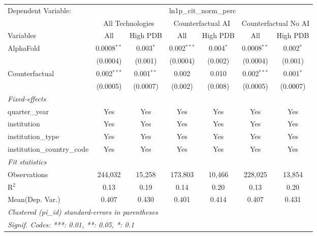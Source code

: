 \begingroup
\centering
\begin{tabular}{lcccccc}
   \tabularnewline \midrule \midrule
   Dependent Variable: & \multicolumn{6}{c}{ln1p\_cit\_norm\_perc}\\
 & \multicolumn{2}{c}{All Technologies} & \multicolumn{2}{c}{Counterfactual AI} & \multicolumn{2}{c}{Counterfactual No AI} \\
\cmidrule(lr){1-1}\cmidrule(lr){2-3} \cmidrule(lr){4-5} \cmidrule(lr){6-7}
Variables & \multicolumn{1}{c}{All} & \multicolumn{1}{c}{High PDB} & \multicolumn{1}{c}{All} & \multicolumn{1}{c}{High PDB} & \multicolumn{1}{c}{All} & \multicolumn{1}{c}{High PDB} \\
\cmidrule(lr){1-1}\cmidrule(lr){2-2} \cmidrule(lr){3-3} \cmidrule(lr){4-4} \cmidrule(lr){5-5} \cmidrule(lr){6-6} \cmidrule(lr){7-7}
   AlphaFold                    & 0.0008$^{**}$ & 0.003$^{*}$  & 0.002$^{***}$ & 0.004$^{*}$ & 0.0008$^{**}$ & 0.002$^{*}$\\   
                                & (0.0004)      & (0.001)      & (0.0004)      & (0.002)     & (0.0004)      & (0.001)\\   
   Counterfactual               & 0.002$^{***}$ & 0.001$^{**}$ & 0.002         & 0.010       & 0.002$^{***}$ & 0.001$^{*}$\\   
                                & (0.0005)      & (0.0007)     & (0.002)       & (0.008)     & (0.0005)      & (0.0007)\\   
   \midrule
   \emph{Fixed-effects}\\
   quarter\_year                & Yes           & Yes          & Yes           & Yes         & Yes           & Yes\\  
   institution                  & Yes           & Yes          & Yes           & Yes         & Yes           & Yes\\  
   institution\_type            & Yes           & Yes          & Yes           & Yes         & Yes           & Yes\\  
   institution\_country\_code   & Yes           & Yes          & Yes           & Yes         & Yes           & Yes\\  
   \midrule
   \emph{Fit statistics}\\
   Observations                 & 244,032       & 15,258       & 173,803       & 10,466      & 228,025       & 13,854\\  
   R$^2$                        & 0.13          & 0.19         & 0.14          & 0.20        & 0.13          & 0.20\\  
Mean(Dep. Var.) & 0.407 & 0.430 & 0.401 & 0.414 & 0.407 & 0.431 \\
   \midrule \midrule
   \multicolumn{7}{l}{\emph{Clustered (pi\_id) standard-errors in parentheses}}\\
   \multicolumn{7}{l}{\emph{Signif. Codes: ***: 0.01, **: 0.05, *: 0.1}}\\
\end{tabular}
\par\endgroup
